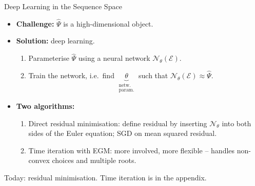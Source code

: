 \documentclass[aspectratio=169,11pt]{beamer}
\newcommand{\emphc}[1]{\textcolor{harvardcrimson}{#1}}
\newcommand{\histE}{\mathcal{E}}  %
\begin{document}
\begin{frame}{Deep Learning in the Sequence Space}
\vspace{0.4em}
\begin{itemize}\itemsep10pt
\item \textbf{Challenge:} $\widehat\Psi$ is a high-dimensional object.

\item \textbf{Solution:} deep learning.
\begin{enumerate}\itemsep1pt
    \item Parameterise $\widehat\Psi$ using a neural network $\mathcal{N}_\theta(\histE)$.
    \item Train the network, i.e.\ find $\underbrace{\theta}_{\substack{\text{netw.}\\ \text{param.}}}$ such that $\mathcal{N}_\theta(\histE) \approx \widehat\Psi$.
\end{enumerate}

\item \textbf{Two algorithms:}
\begin{enumerate}\itemsep1pt
    \item \emphc{Direct residual minimisation}: define residual by inserting $\mathcal{N}_\theta$ into both sides of the Euler equation; SGD on mean squared residual.
    \item \emphc{Time iteration with EGM}: more involved, more flexible -- handles non-convex choices and multiple roots.
\end{enumerate}
\end{itemize}
\vspace{0.2em}
{\footnotesize Today: residual minimisation.  Time iteration is in the appendix.}
\end{frame}
\end{document}

